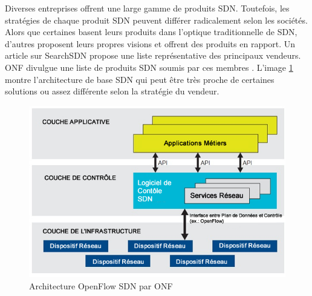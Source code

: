 

Diverses entreprises offrent une large gamme de produits SDN. Toutefois, les stratégies de chaque produit SDN peuvent différer radicalement selon les sociétés. Alors que certaines basent leurs produits dans l'optique traditionnelle de SDN, d'autres proposent leurs propres visions et offrent des produits en rapport. Un article sur SearchSDN \cite{42Vendors} propose une liste représentative des principaux vendeurs. ONF divulgue une liste de produits SDN soumis par ces membres \cite{ProductDirectory}.  
L'image \ref{imgArchi} montre l'architecture de base SDN qui peut être très proche de certaines solutions ou assez différente selon la stratégie du vendeur.

\begin{figure}[!h] %
\includegraphics[width=15cm]{images/openflowArchi.jpg} %
\caption{ Architecture OpenFlow SDN par ONF \cite{SDNNewNormONFExecutiveSummary}} %
\label{imgArchi} %
\end{figure} %


